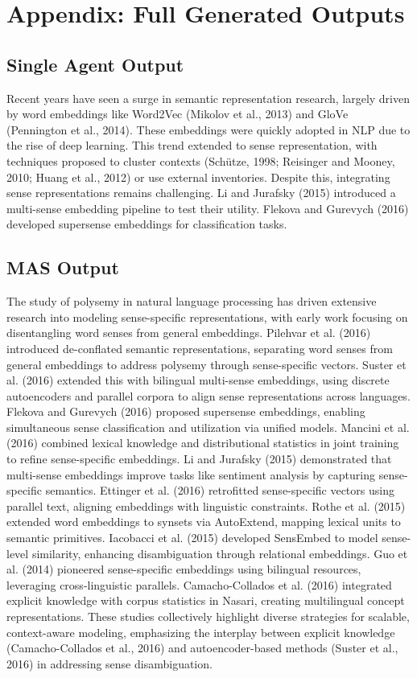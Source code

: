 \documentclass[conference]{IEEEtran}
\begin{document}



\section*{Appendix: Full Generated Outputs}
\subsection*{Single Agent Output}
\small
Recent years have seen a surge in semantic representation research, largely driven by word embeddings like Word2Vec (Mikolov et al., 2013) and GloVe (Pennington et al., 2014). These embeddings were quickly adopted in NLP due to the rise of deep learning. This trend extended to sense representation, with techniques proposed to cluster contexts (Sch\"utze, 1998; Reisinger and Mooney, 2010; Huang et al., 2012) or use external inventories. Despite this, integrating sense representations remains challenging. Li and Jurafsky (2015) introduced a multi-sense embedding pipeline to test their utility. Flekova and Gurevych (2016) developed supersense embeddings for classification tasks.

\subsection*{MAS Output}
\small
The study of polysemy in natural language processing has driven extensive research into modeling sense-specific representations, with early work focusing on disentangling word senses from general embeddings. Pilehvar et al. (2016) introduced de-conflated semantic representations, separating word senses from general embeddings to address polysemy through sense-specific vectors. Suster et al. (2016) extended this with bilingual multi-sense embeddings, using discrete autoencoders and parallel corpora to align sense representations across languages. Flekova and Gurevych (2016) proposed supersense embeddings, enabling simultaneous sense classification and utilization via unified models. Mancini et al. (2016) combined lexical knowledge and distributional statistics in joint training to refine sense-specific embeddings. Li and Jurafsky (2015) demonstrated that multi-sense embeddings improve tasks like sentiment analysis by capturing sense-specific semantics. Ettinger et al. (2016) retrofitted sense-specific vectors using parallel text, aligning embeddings with linguistic constraints. Rothe et al. (2015) extended word embeddings to synsets via AutoExtend, mapping lexical units to semantic primitives. Iacobacci et al. (2015) developed SensEmbed to model sense-level similarity, enhancing disambiguation through relational embeddings. Guo et al. (2014) pioneered sense-specific embeddings using bilingual resources, leveraging cross-linguistic parallels. Camacho-Collados et al. (2016) integrated explicit knowledge with corpus statistics in Nasari, creating multilingual concept representations. These studies collectively highlight diverse strategies for scalable, context-aware modeling, emphasizing the interplay between explicit knowledge (Camacho-Collados et al., 2016) and autoencoder-based methods (Suster et al., 2016) in addressing sense disambiguation.
\end{document}
